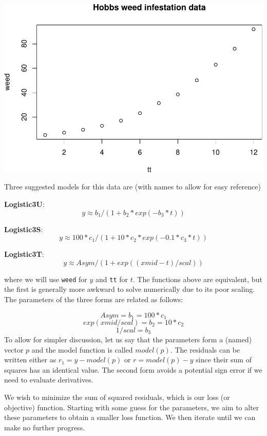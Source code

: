 \documentclass[
]{article}
\begin{document}
\includegraphics{StateOfRToolsForNLS_files/figure-latex/ex01-1.pdf}

Three suggested models for this data are (with names to allow for easy
reference)

\textbf{Logistic3U}: \[  y \approx  b_1 / (1 + b_2 * exp(- b_3 * t)) \]

\textbf{Logistic3S}:
\[ y \approx  100 * c_1 / (1 + 10 * c_2 * exp(- 0.1 * c_3 * t)) \]

\textbf{Logistic3T}: \[ y \approx Asym / (1 + exp((xmid - t)/scal)) \]

where we will use \texttt{weed} for \(y\) and \texttt{tt} for \(t\). The
functions above are equivalent, but the first is generally more awkward
to solve numerically due to its poor scaling. The parameters of the
three forms are related as follows:

\[   Asym =  b_1 = 100 * c_1 \] \[ exp(xmid/scal)  =  b_2 = 10 * c_2 \]
\[ 1/scal  =  b_3 \] To allow for simpler discussion, let us say that
the parameters form a (named) vector \(p\) and the model function is
called \(model(p)\). The residuals can be written either as
\(r_1 = y - model(p)\) or \(r = model(p) - y\) since their sum of
squares has an identical value. The second form avoids a potential sign
error if we need to evaluate derivatives.

We wish to minimize the sum of squared residuals, which is our loss (or
objective) function. Starting with some guess for the parameters, we aim
to alter these parameters to obtain a smaller loss function. We then
iterate until we can make no further progress.
\end{document}
